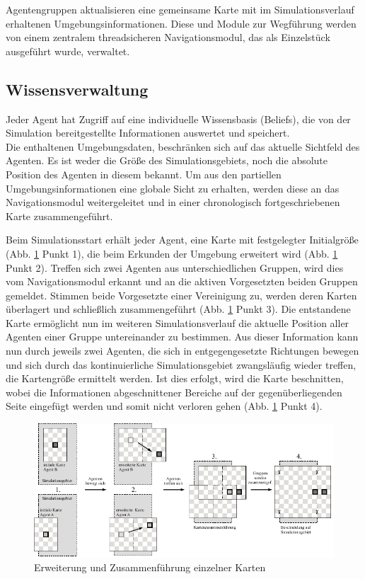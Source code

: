 \documentclass[runningheads]{llncs}
\begin{document}
Agentengruppen aktualisieren eine gemeinsame Karte mit im Simulationsverlauf erhaltenen Umgebungsinformationen. Diese und Module zur Wegführung werden von einem zentralem threadsicheren Navigationsmodul, das als Einzelstück ausgeführt wurde, verwaltet. 


\subsection{Wissensverwaltung}\label{wissensverwaltung}
Jeder Agent hat Zugriff auf eine individuelle Wissensbasis (Beliefs), die von der Simulation bereitgestellte Informationen auswertet und speichert. \\
Die enthaltenen Umgebungsdaten, beschränken sich auf das aktuelle Sichtfeld des Agenten. Es ist weder die Größe des Simulationsgebiets, noch die absolute Position des Agenten in diesem bekannt. 
Um aus den partiellen Umgebungsinformationen eine globale Sicht zu erhalten, werden diese an das Navigationsmodul weitergeleitet und in einer chronologisch fortgeschriebenen Karte zusammengeführt.

Beim Simulationsstart erhält jeder Agent, eine Karte mit festgelegter Initialgröße (Abb. \ref{Karte} Punkt 1), die beim Erkunden der Umgebung erweitert wird (Abb. \ref{Karte} Punkt 2). Treffen sich zwei Agenten aus unterschiedlichen Gruppen, wird dies vom Navigationsmodul erkannt und an die aktiven Vorgesetzten beiden Gruppen gemeldet. Stimmen beide Vorgesetzte einer Vereinigung zu, werden deren Karten überlagert und schließlich zusammengeführt (Abb. \ref{Karte} Punkt 3). Die entstandene Karte ermöglicht nun im weiteren Simulationsverlauf die aktuelle Position aller Agenten einer Gruppe untereinander zu bestimmen. Aus dieser Information kann nun durch jeweils zwei Agenten, die sich in entgegengesetzte Richtungen bewegen und sich durch das kontinuierliche Simulationsgebiet zwangsläufig wieder treffen, die Kartengröße ermittelt werden. Ist dies erfolgt, wird die Karte beschnitten, wobei die Informationen abgeschnittener Bereiche auf der gegenüberliegenden Seite eingefügt werden und somit nicht verloren gehen (Abb. \ref{Karte} Punkt 4).
\begin{figure}[h]
\includegraphics{./Referenzen/Kartenmerge.pdf}
\caption{Erweiterung und Zusammenführung einzelner Karten}
\label{Karte}
\end{figure}
\end{document}
